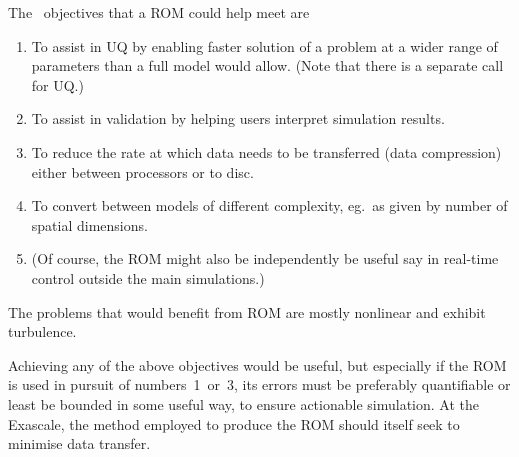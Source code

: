 The \nep\ objectives that a ROM could help meet are
\begin{enumerate}
\item To assist in UQ by enabling faster solution of a problem at a wider range of
parameters than a full model would allow.
(Note that there is a separate call for UQ.)
\item To assist in validation by helping users interpret simulation results.
\item To reduce the rate at which data needs to be transferred (data compression)
either between processors or to disc.
\item To convert between models of different complexity, eg.\ as
given by number of spatial dimensions.
\item (Of course, the ROM might also be independently be useful say in real-time
control outside the main simulations.) 
\end{enumerate}
The problems that would benefit from ROM are mostly nonlinear and exhibit turbulence.

Achieving any of the above objectives would be useful, but especially
if the ROM is used in pursuit of numbers~1~or~3,
its errors must be preferably quantifiable or least be
bounded in some useful way, to ensure actionable simulation.
At the Exascale, the method employed to produce the ROM should itself seek
to minimise data transfer.

